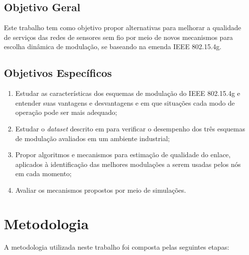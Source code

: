 \subsection{Objetivo Geral}
\label{subsec:objgeral}

Este trabalho tem como objetivo propor alternativas para melhorar a qualidade de serviços das redes de sensores sem fio por meio de novos mecanismos para escolha dinâmica de modulação, se baseando na emenda IEEE 802.15.4g.

\subsection{Objetivos Específicos}
\label{subsec:objespecificos}

\begin{enumerate}
    \item Estudar as características dos esquemas de modulação do IEEE 802.15.4g e entender suas vantagens e desvantagens e em que situações cada modo de operação pode ser mais adequado;
    \item  Estudar o \textit{dataset} descrito em \cite{tuset2020evaluating} para verificar o desempenho dos três esquemas de modulação avaliados em um ambiente industrial;
    \item Propor algoritmos e mecanismos para estimação de qualidade do enlace, aplicados à identificação das  melhores modulações a serem usadas pelos nós em cada momento;
    \item Avaliar os mecanismos propostos por meio de simulações.
\end{enumerate}

\section{Metodologia}
\label{sec:metodologia}

A metodologia utilizada neste trabalho foi composta pelas seguintes etapas: 

